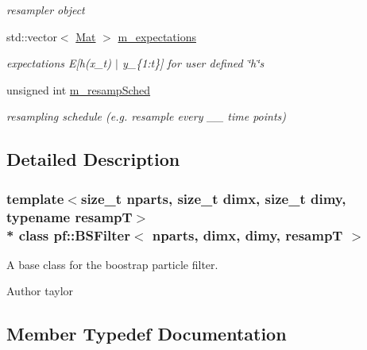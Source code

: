 \begin{DoxyCompactItemize}
\begin{DoxyCompactList}\small\item\em resampler object \end{DoxyCompactList}\item 
std\+::vector$<$ \hyperlink{classpf_1_1BSFilter_a0fea63439948d095468ec14792abb396}{Mat} $>$ \hyperlink{classpf_1_1BSFilter_abdddf9da762b8b5454ddb98bbfba53d6}{m\+\_\+expectations}\hypertarget{classpf_1_1BSFilter_abdddf9da762b8b5454ddb98bbfba53d6}{}\label{classpf_1_1BSFilter_abdddf9da762b8b5454ddb98bbfba53d6}

\begin{DoxyCompactList}\small\item\em expectations E\mbox{[}h(x\+\_\+t) $\vert$ y\+\_\+\{1\+:t\}\mbox{]} for user defined \char`\"{}h\char`\"{}s \end{DoxyCompactList}\item 
unsigned int \hyperlink{classpf_1_1BSFilter_a8bf45df72ff688f972ef77cf199bfda1}{m\+\_\+resamp\+Sched}\hypertarget{classpf_1_1BSFilter_a8bf45df72ff688f972ef77cf199bfda1}{}\label{classpf_1_1BSFilter_a8bf45df72ff688f972ef77cf199bfda1}

\begin{DoxyCompactList}\small\item\em resampling schedule (e.\+g. resample every \+\_\+\+\_\+ time points) \end{DoxyCompactList}\end{DoxyCompactItemize}


\subsection{Detailed Description}
\subsubsection*{template$<$size\+\_\+t nparts, size\+\_\+t dimx, size\+\_\+t dimy, typename resampT$>$\\*
class pf\+::\+B\+S\+Filter$<$ nparts, dimx, dimy, resamp\+T $>$}

A base class for the boostrap particle filter. 

\begin{DoxyAuthor}{Author}
taylor 
\end{DoxyAuthor}


\subsection{Member Typedef Documentation}

